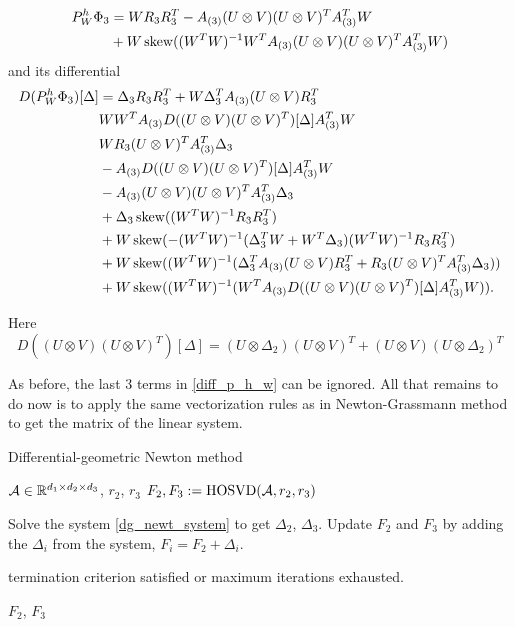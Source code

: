 \begin{equation}
\begin{split}
 P^h_W \Phi_3 & = W R_3 R_3^T - A_{(3)} (U \otimes V) (U \otimes V)^T A_{(3)}^T W  \\
              &  + W \operatorname*{skew}( (W^T W)^{-1} W^T A_{(3)} (U \otimes V)(U \otimes V)^T A_{(3)}^T W )
\end{split}
 \end{equation}
and its differential
\begin{equation}
\label{diff_p_h_w}
\begin{split}
 D(P^h_W \Phi_3) [ \Delta ] & =\Delta_3 R_3 R_3^T + W \Delta_3^T A_{(3)} (U \otimes V) R_3^T  \\
&  W W^T A_{(3)} D ( ( U \otimes V)(U \otimes V)^T ) [\Delta] A_{(3)}^T W \\
& W R_3 (U \otimes V)^T A_{(3)}^T \Delta_3  \\
&- A_{(3)} D ( ( U \otimes V)(U \otimes V)^T ) [\Delta] A_{(3)}^T W \\
& -  A_{(3)}  ( U \otimes V)(U \otimes V)^T A_{(3)}^T \Delta_3 \\
& + \Delta_3 \operatorname*{skew} ( (W^T W)^{-1} R_3 R_3^T ) \\
& + W \operatorname*{skew} ( - (W^T W)^{-1} ( \Delta_3^T W + W^T \Delta_3) (W^T W)^{-1} R_3 R_3^T) \\
& +  W \operatorname*{skew} ( (W^T W)^{-1} ( \Delta_3^T A_{(3)} ( U \otimes V) R_3^T + R_3 (U \otimes V)^T A_{(3)}^T \Delta_3 ) ) \\
& +  W \operatorname*{skew} ( (W^T W)^{-1} ( W^T A_{(3)} D ( ( U \otimes V)(U \otimes V)^T)[\Delta]  A_{(3)}^T W ) ). \end{split}
\end{equation}

Here
\begin{equation}
 D( ( U \otimes V)(U \otimes V)^T ) [\Delta] = ( U \otimes \Delta_2 )(U \otimes V)^T + ( U \otimes V)  ( U \otimes \Delta_2 )^T 
\end{equation}


As before, the last $3$ terms in \eqref{diff_p_h_w} can be ignored. All that remains to do now
is to apply the same vectorization rules as in Newton-Grassmann method to get the matrix of the linear system.




\begin{algorithm}
\caption{Differential-geometric Newton method}\label{dgn_algo}
\begin{algorithmic}[1]
 { $\mathcal{A} \in \mathbb{R}^{d_1 \times d_2 \times d_3}$, $r_2$, $r_3$}
\State $F_2, F_3 := \mbox{HOSVD}(\mathcal{A}, r_2, r_3)$
\Repeat 

\State Solve the system \eqref{dg_newt_system} to get $\Delta_2$, $\Delta_3$.
\State Update $F_2$ and $F_3$ by adding the $\Delta_i$ from the system, $F_i = F_2 + \Delta_i.$
    
\Until termination criterion satisfied or maximum iterations exhausted.


\State \Return $F_2$, $F_3$


\EndFunction
\end{algorithmic}
\end{algorithm}
